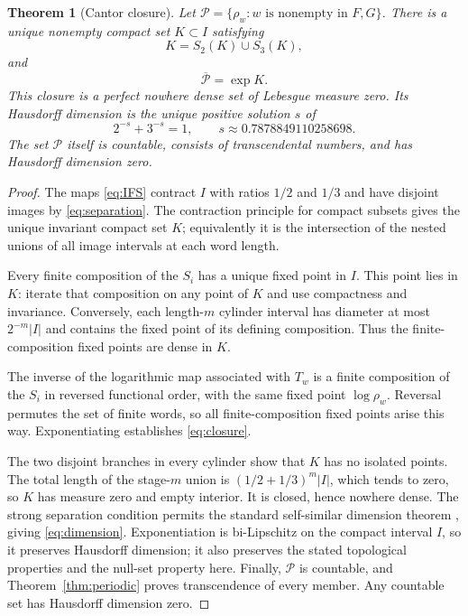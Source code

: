 \documentclass[11pt,a4paper]{article}
\numberwithin{equation}{section}
\newtheorem{theorem}{Theorem}[section]
\theoremstyle{definition}
\theoremstyle{remark}
\begin{document}
\begin{theorem}[Cantor closure]\label{thm:cantor}
Let $\mathcal P=\{\rho_w:w\text{ is nonempty in }F,G\}$. There is a unique nonempty compact set $K\subset I$ satisfying
\[
 K=S_2(K)\cup S_3(K),
\]
and
\begin{equation}\label{eq:closure}
 \overline{\mathcal P}=\exp K.
\end{equation}
This closure is a perfect nowhere dense set of Lebesgue measure zero. Its Hausdorff dimension is the unique positive solution $s$ of
\begin{equation}\label{eq:dimension}
 2^{-s}+3^{-s}=1,
 \qquad s\approx0.7878849110258698.
\end{equation}
The set $\mathcal P$ itself is countable, consists of transcendental numbers, and has Hausdorff dimension zero.
\end{theorem}
\begin{proof}
The maps \eqref{eq:IFS} contract $I$ with ratios $1/2$ and $1/3$ and have disjoint images by \eqref{eq:separation}. The contraction principle for compact subsets gives the unique invariant compact set $K$; equivalently it is the intersection of the nested unions of all image intervals at each word length.

Every finite composition of the $S_i$ has a unique fixed point in $I$. This point lies in $K$: iterate that composition on any point of $K$ and use compactness and invariance. Conversely, each length-$m$ cylinder interval has diameter at most $2^{-m}|I|$ and contains the fixed point of its defining composition. Thus the finite-composition fixed points are dense in $K$.

The inverse of the logarithmic map associated with $T_w$ is a finite composition of the $S_i$ in reversed functional order, with the same fixed point $\log\rho_w$. Reversal permutes the set of finite words, so all finite-composition fixed points arise this way. Exponentiating establishes \eqref{eq:closure}.

The two disjoint branches in every cylinder show that $K$ has no isolated points. The total length of the stage-$m$ union is $(1/2+1/3)^m|I|$, which tends to zero, so $K$ has measure zero and empty interior. It is closed, hence nowhere dense. The strong separation condition permits the standard self-similar dimension theorem \cite{Hutchinson}, giving \eqref{eq:dimension}. Exponentiation is bi-Lipschitz on the compact interval $I$, so it preserves Hausdorff dimension; it also preserves the stated topological properties and the null-set property here. Finally, $\mathcal P$ is countable, and Theorem~\ref{thm:periodic} proves transcendence of every member. Any countable set has Hausdorff dimension zero.
\end{proof}
\end{document}
